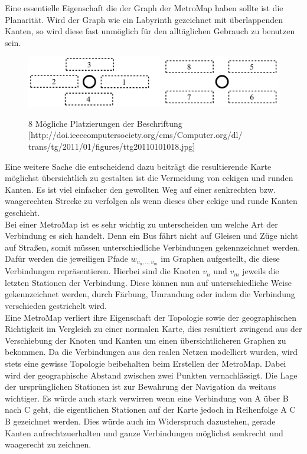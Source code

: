 Eine essentielle Eigenschaft die der Graph der MetroMap haben sollte ist die Planarität. Wird der Graph wie ein Labyrinth gezeichnet mit überlappenden Kanten, so wird diese fast unmöglich für den alltäglichen Gebrauch zu benutzen sein.

\begin{figure}[t]
	\centering
	{\includegraphics[scale=0.25]{bilder/labelplacements}\label{fig_labelplacements}
	}\\
	\caption[8 Mögliche Platzierungen der Beschriftung]{8 Mögliche Platzierungen der Beschriftung [http://doi.ieeecomputersociety.org/cms/Computer.org/dl/ trans/tg/2011/01/figures/ttg20110101018.jpg]}
	\label{fig_labelplacements}
\end{figure}

Eine weitere Sache die entscheidend dazu beiträgt die resultierende Karte möglichst übersichtlich zu gestalten ist die Vermeidung von eckigen und runden Kanten. Es ist viel einfacher den gewollten Weg auf einer senkrechten bzw. waagerechten Strecke zu verfolgen als wenn dieses über eckige und runde Kanten geschieht. \\

Bei einer MetroMap ist es sehr wichtig zu unterscheiden um welche Art der Verbindung es sich handelt. Denn ein Bus fährt nicht auf Gleisen und Züge nicht auf Straßen, somit müssen unterschiedliche Verbindungen gekennzeichnet werden. Dafür werden die jeweiligen Pfade $w_{v_{n}, .., v_{m}}$ im Graphen aufgestellt, die diese Verbindungen repräsentieren. Hierbei sind die Knoten $v_{n}$ und $v_{m}$ jeweils die letzten Stationen der Verbindung. Diese können nun auf unterschiedliche Weise gekennzeichnet werden, durch Färbung, Umrandung oder indem die Verbindung verschieden gestrichelt wird. \\

Eine MetroMap verliert ihre Eigenschaft der Topologie sowie der geographischen Richtigkeit im Vergleich zu einer normalen Karte, dies resultiert zwingend aus der Verschiebung der Knoten und Kanten um einen übersichtlicheren Graphen zu bekommen. Da die Verbindungen aus den realen Netzen modelliert wurden, wird stets eine gewisse Topologie beibehalten beim Erstellen der MetroMap. Dabei wird der geographische Abstand zwischen zwei Punkten vernachlässigt. Die Lage der ursprünglichen Stationen ist zur Bewahrung der Navigation da weitaus wichtiger. Es würde auch stark verwirren wenn eine Verbindung von A über B nach C geht, die eigentlichen Stationen auf der Karte jedoch in Reihenfolge A C B gezeichnet werden. Dies würde auch im Widerspruch dazustehen, gerade Kanten aufrechtzuerhalten und ganze Verbindungen möglichst senkrecht und waagerecht zu zeichnen. \\

